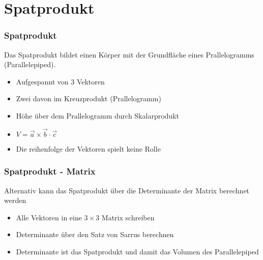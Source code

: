 \section{Spatprodukt}
\begin{frame}
    \frametitle{Spatprodukt}
    Das Spatprodukt bildet einen Körper mit der Grundfläche eines Prallelogramms (Parallelepiped).
    \begin{itemize}
        \item Aufgespannt von 3 Vektoren
        \item Zwei davon im Kreuzprodukt (Prallelogramm)
        \item Höhe über dem Prallelogramm durch Skalarprodukt
        \item $V = \vec{a} \times \vec{b} \cdot \vec{c}$
        \item Die reihenfolge der Vektoren spielt keine Rolle
    \end{itemize}
\end{frame}

\begin{frame}
    \frametitle{Spatprodukt  - Matrix}
    Alternativ kann das Spatprodukt über die Determinante der Matrix berechnet werden
    \begin{itemize}
        \item Alle Vektoren in eine $3 \times 3$ Matrix schreiben
        \item Determinante über den Satz von Sarrus berechnen
        \item Determinante ist das Spatprodukt und damit das Volumen des Parallelepiped
    \end{itemize}
\end{frame}